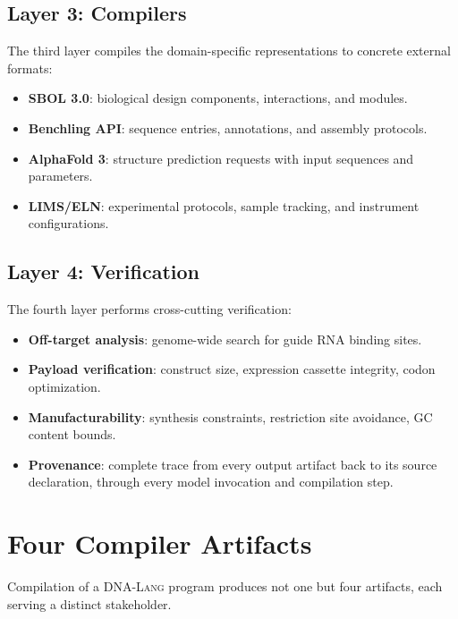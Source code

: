 \documentclass[12pt,a4paper]{article}
\newcommand{\DNALang}{\textsc{DNA-Lang}}
\begin{document}
\subsection{Layer 3: Compilers}

The third layer compiles the domain-specific representations to concrete external formats:
\begin{itemize}
    \item \textbf{SBOL 3.0}: biological design components, interactions, and modules.
    \item \textbf{Benchling API}: sequence entries, annotations, and assembly protocols.
    \item \textbf{AlphaFold 3}: structure prediction requests with input sequences and parameters.
    \item \textbf{LIMS/ELN}: experimental protocols, sample tracking, and instrument configurations.
\end{itemize}

\subsection{Layer 4: Verification}

The fourth layer performs cross-cutting verification:
\begin{itemize}
    \item \textbf{Off-target analysis}: genome-wide search for guide RNA binding sites.
    \item \textbf{Payload verification}: construct size, expression cassette integrity, codon optimization.
    \item \textbf{Manufacturability}: synthesis constraints, restriction site avoidance, GC content bounds.
    \item \textbf{Provenance}: complete trace from every output artifact back to its source declaration, through every model invocation and compilation step.
\end{itemize}


\section{Four Compiler Artifacts}
\label{sec:artifacts}

Compilation of a \DNALang{} program produces not one but four artifacts, each serving a distinct stakeholder.
\end{document}
